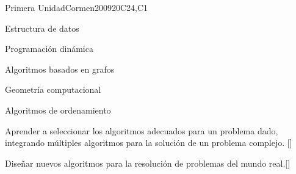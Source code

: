 \begin{syllabus}
\begin{unit}{Primera Unidad}{}{Cormen2009}{20}{C24,C1}
\begin{topics}
        \item Estructura de datos
        \item Programación dinámica
        \item Algoritmos basados en grafos
        \item Geometría computacional
        \item Algoritmos de ordenamiento
\end{topics}
\begin{learningoutcomes}
        \item Aprender a seleccionar los algoritmos adecuados para un problema dado, integrando múltiples algoritmos para la solución de un problema complejo. [\Usage]
	\item Diseñar nuevos algoritmos para la resolución de problemas del mundo real.[\Usage]
\end{learningoutcomes}
\end{unit}

\begin{coursebibliography}
\end{coursebibliography}

\end{syllabus}
